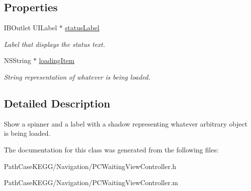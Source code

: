 \subsection*{Properties}
\begin{DoxyCompactItemize}
\item 
\hypertarget{interface_p_c_waiting_view_controller_a84e942f7299d5611b9927d13087ccff8}{
IBOutlet UILabel $\ast$ \hyperlink{interface_p_c_waiting_view_controller_a84e942f7299d5611b9927d13087ccff8}{statusLabel}}
\label{interface_p_c_waiting_view_controller_a84e942f7299d5611b9927d13087ccff8}

\begin{DoxyCompactList}\small\item\em Label that displays the status text. \end{DoxyCompactList}\item 
\hypertarget{interface_p_c_waiting_view_controller_a6e25577b37bd3d36756bbb7fec74edee}{
NSString $\ast$ \hyperlink{interface_p_c_waiting_view_controller_a6e25577b37bd3d36756bbb7fec74edee}{loadingItem}}
\label{interface_p_c_waiting_view_controller_a6e25577b37bd3d36756bbb7fec74edee}

\begin{DoxyCompactList}\small\item\em String representation of whatever is being loaded. \end{DoxyCompactList}\end{DoxyCompactItemize}


\subsection{Detailed Description}
Show a spinner and a label with a shadow representing whatever arbitrary object is being loaded. 

The documentation for this class was generated from the following files:\begin{DoxyCompactItemize}
\item 
PathCaseKEGG/Navigation/PCWaitingViewController.h\item 
PathCaseKEGG/Navigation/PCWaitingViewController.m\end{DoxyCompactItemize}
